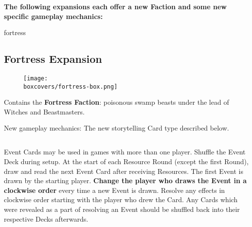 \textbf{The following expansions each offer a new Faction and some new specific gameplay mechanics:}
\begin{multicols}{2}
\begin{expansion}[title=]{fortress}
  \subsection*{\color{fortress}Fortress Expansion}
  \setlength\intextsep{0pt}
  \setlength\columnsep{0.8em}
  \begin{wrapfigure}{l}{0.35\textwidth}
      \texttt{[image: \\boxcovers/fortress-box.png]}
  \end{wrapfigure}
  Contains the \textbf{Fortress Faction}: poisonous swamp beasts under the lead of Witches and Beastmasters.\par
  \medskip
  New gameplay mechanics: The new storytelling Card type described below.
  \medskip
  \subsection*{}
  Event Cards may be used in games with more than one player.
  Shuffle the Event Deck during setup.
  At the start of each Resource Round (except the first Round), draw and read the next Event Card after receiving Resources.
  The first Event is drawn by the starting player.
  \textbf{Change the player who draws the Event in a clockwise order} every time a new Event is drawn.
  Resolve any effects in clockwise order starting with the player who drew the Card.
  Any Cards which were revealed as a part of resolving an Event should be shuffled back into their respective Decks afterwards.

  \medskip


\end{expansion}
\end{multicols}
